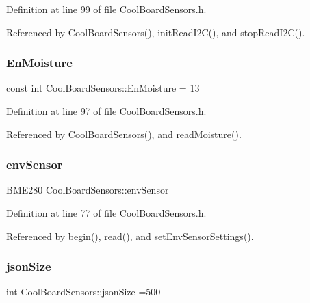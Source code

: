 Definition at line 99 of file Cool\+Board\+Sensors.\+h.



Referenced by Cool\+Board\+Sensors(), init\+Read\+I2\+C(), and stop\+Read\+I2\+C().

\mbox{\label{classCoolBoardSensors_a6177d02e14a057a2f171a2e930b5038d}} 
\subsubsection{\texorpdfstring{En\+Moisture}{EnMoisture}}
{\footnotesize\ttfamily const int Cool\+Board\+Sensors\+::\+En\+Moisture = 13\hspace{0.3cm}{\ttfamily [private]}}



Definition at line 97 of file Cool\+Board\+Sensors.\+h.



Referenced by Cool\+Board\+Sensors(), and read\+Moisture().

\mbox{\label{classCoolBoardSensors_a868e38985e9a2412829fa2790ca13e2e}} 
\subsubsection{\texorpdfstring{env\+Sensor}{envSensor}}
{\footnotesize\ttfamily B\+M\+E280 Cool\+Board\+Sensors\+::env\+Sensor}



Definition at line 77 of file Cool\+Board\+Sensors.\+h.



Referenced by begin(), read(), and set\+Env\+Sensor\+Settings().

\mbox{\label{classCoolBoardSensors_a05a40dc80bfff14ffb830f549b876f8d}} 
\subsubsection{\texorpdfstring{json\+Size}{jsonSize}}
{\footnotesize\ttfamily int Cool\+Board\+Sensors\+::json\+Size =500\hspace{0.3cm}{\ttfamily [private]}}



